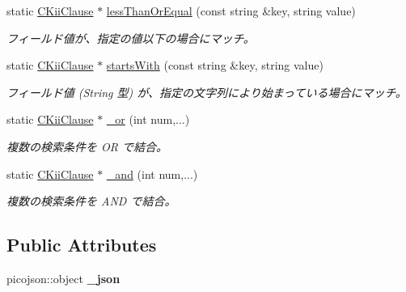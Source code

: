 \begin{DoxyCompactItemize}
static \hyperlink{class_c_kii_clause}{C\-Kii\-Clause} $\ast$ \hyperlink{class_c_kii_clause_af29deffd31d4f1a6652d0bdf07023b09}{less\-Than\-Or\-Equal} (const string \&key, string value)
\begin{DoxyCompactList}\small\item\em フィールド値が、指定の値以下の場合にマッチ。 \end{DoxyCompactList}\item 
static \hyperlink{class_c_kii_clause}{C\-Kii\-Clause} $\ast$ \hyperlink{class_c_kii_clause_a30b50d4890dc98070ccf2063fe118ca7}{starts\-With} (const string \&key, string value)
\begin{DoxyCompactList}\small\item\em フィールド値 (String 型) が、指定の文字列により始まっている場合にマッチ。 \end{DoxyCompactList}\item 
static \hyperlink{class_c_kii_clause}{C\-Kii\-Clause} $\ast$ \hyperlink{class_c_kii_clause_adae9a85142b4967ffcfc394fde9c411b}{\-\_\-or} (int num,...)
\begin{DoxyCompactList}\small\item\em 複数の検索条件を O\-R で結合。 \end{DoxyCompactList}\item 
static \hyperlink{class_c_kii_clause}{C\-Kii\-Clause} $\ast$ \hyperlink{class_c_kii_clause_adb2a685dae02d8287962813da44860f2}{\-\_\-and} (int num,...)
\begin{DoxyCompactList}\small\item\em 複数の検索条件を A\-N\-D で結合。 \end{DoxyCompactList}\end{DoxyCompactItemize}
\subsection*{Public Attributes}
\begin{DoxyCompactItemize}
\item 
\hypertarget{class_c_kii_clause_acfc92615decf8779aedf763ea81eefd6}{picojson\-::object {\bfseries \-\_\-json}}\label{class_c_kii_clause_acfc92615decf8779aedf763ea81eefd6}

\end{DoxyCompactItemize}


